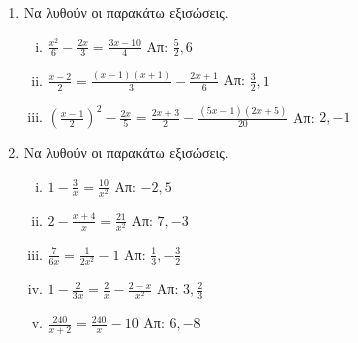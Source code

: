 \begin{enumerate}
  \item Να λυθούν οι παρακάτω εξισώσεις.
    \begin{enumerate}[i)]
      \item $ \frac{x^{2}}{6} - \frac{2x}{3} = \frac{3x-10}{4} $ \hfill Απ: $
        \frac{5}{2}, 6 $
      \item $ \frac{x-2}{2} = \frac{(x-1)(x+1)}{3} - \frac{2x+1}{6} $ \hfill Απ: $
        \frac{3}{2}, 1 $ 
      \item $ \left(\frac{x-1}{2}\right)^{2} - \frac{2x}{5} = \frac{2x+3}{2} - \frac{(5x-1)(2x+5)}{20}
        $ \hfill Απ: $ 2, -1 $ 
    \end{enumerate}

  \item Να λυθούν οι παρακάτω εξισώσεις.
    \begin{enumerate}[i)]
      \item $ 1 - \frac{3}{x} = \frac{10}{x^{2}} $ \hfill Απ: $ -2, 5 $
      \item $ 2 - \frac{x+4}{x} = \frac{21}{x^{2}} $ \hfill Απ: $ 7, -3 $
      \item $ \frac{7}{6x} = \frac{1}{2x^{2}} - 1 $ \hfill Απ: $ \frac{1}{3},
        -\frac{3}{2} $ 
      \item $ 1 - \frac{2}{3x} = \frac{2}{x} - \frac{2-x}{x^{2}} $ \hfill Απ: $ 3,
        \frac{2}{3} $  
      \item $ \frac{240}{x+2} = \frac{240}{x} - 10 $ \hfill Απ: $ 6, -8 $
    \end{enumerate}


\end{enumerate}



